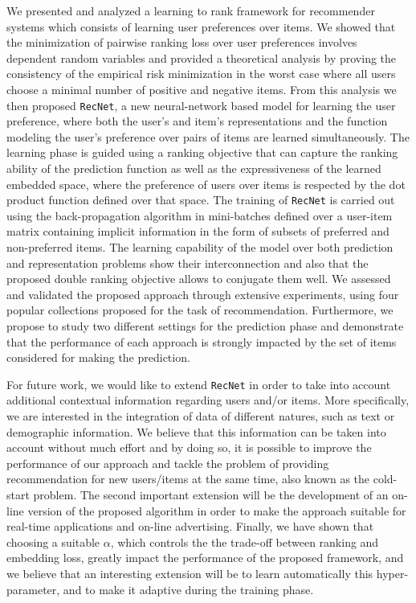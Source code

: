 \documentclass[10pt,journal,compsoc]{IEEEtran}
\newcommand{\RecNet}{\texttt{RecNet}}
\begin{document}
\begin{sloppypar}
We presented and analyzed a learning to rank framework for recommender systems which consists of learning user preferences over items. We showed that the minimization of pairwise ranking loss over user preferences involves dependent random variables and provided a theoretical analysis by proving the consistency of the empirical risk minimization in the worst case where all users choose a minimal number of positive and negative items. From this analysis we then proposed {\RecNet}, a new neural-network based model for learning the user preference, where both the user's and item's representations and the function modeling the user's preference over pairs of items are learned simultaneously. The learning phase is guided using a ranking objective that can capture the ranking ability of the prediction function as well as the expressiveness of the learned embedded space, where the preference of users over items is respected by the dot product function defined over that space. The training of {\RecNet} is carried out using the back-propagation algorithm in mini-batches defined over a user-item matrix containing implicit information in the form of subsets of preferred and non-preferred items. The learning capability of the model over both prediction and representation problems show their interconnection and also that the proposed double ranking objective allows to conjugate them well.  We assessed and validated the proposed approach through extensive experiments, using four popular collections proposed for the task of recommendation. Furthermore, we propose to study two different settings for the prediction phase and demonstrate that the performance of each approach is strongly impacted by the set of items considered for making the prediction.

\medskip

For future work, we would like to extend {\RecNet} in order to take into account additional contextual information regarding users and/or items. More specifically, we are interested in the integration of data of different natures, such as text or demographic information. We believe that this information can be taken into account without much effort and by doing so, it is possible to improve the performance of our approach and tackle the problem of providing recommendation for new users/items at the same time, also known as the cold-start problem. The second important extension will be the development of an on-line version of the proposed algorithm in order to make the approach suitable for real-time applications and on-line advertising. Finally, we have shown that choosing a suitable $\alpha$, which controls the the trade-off between ranking and embedding loss, greatly impact the performance of the proposed framework, and we believe that an interesting extension will be to learn automatically this hyper-parameter, and to make it adaptive during the training phase.


\end{sloppypar}
\end{document}
